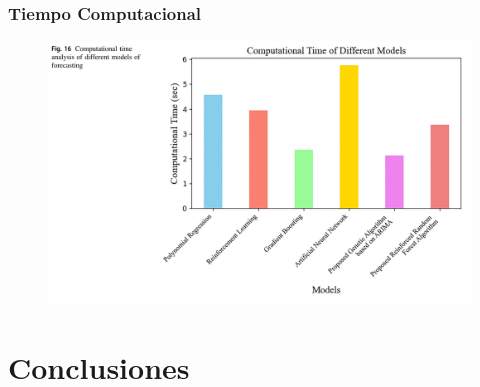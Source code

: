 \documentclass[aspectratio=1610]{beamer}
\begin{document}
\begin{frame}[fragile]
    \frametitle{Tiempo Computacional}
    \begin{figure}
        \centering
        \includegraphics[width=1\textwidth]{Opti-Imagenes/01-08.png}
    \end{figure}
\end{frame}











\section{Conclusiones}






\end{document}
